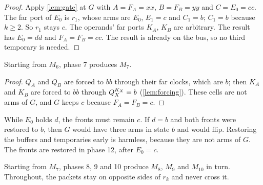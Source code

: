 \begin{proof}
Apply \cref{lem:gate} at $G$ with $A=F_A=xx$, $B=F_B=yy$ and $C=E_0=cc$. The far port of $E_0$ is
$r_1$, whose arms are $E_0$, $E_1=c$ and $C_1=b$; $C_1=b$ because $k\ge2$. So $r_1$ stays $c$. The
operands' far ports $K_A$, $K_B$ are arbitrary. The result has $E_0=dd$ and $F_A=F_B=cc$. The result
is already on the bus, so no third temporary is needed.
\end{proof}

\begin{lemma}\label{lem:clean}
Starting from $M_6$, phase 7 produces $M_7$.
\end{lemma}

\begin{proof}
$Q_A$ and $Q_B$ are forced to $bb$ through their far clocks, which are $b$; then $K_A$ and $K_B$ are
forced to $bb$ through $Q_X^{K_X}=b$ (\cref{lem:forcing}). These cells are not arms of $G$, and $G$
keeps $c$ because $F_A=F_B=c$.
\end{proof}

\begin{remark}\label{rem:fronts}
While $E_0$ holds $d$, the fronts must remain $c$. If $d=b$ and both fronts were restored to $b$, then
$G$ would have three arms in state $b$ and would flip. Restoring the buffers and temporaries early is
harmless, because they are not arms of $G$. The fronts are restored in phase 12, after $E_0=c$.
\end{remark}

\begin{lemma}\label{lem:writeroutes}
Starting from $M_7$, phases 8, 9 and 10 produce $M_8$, $M_9$ and $M_{10}$ in turn. Throughout, the
packets stay on opposite sides of $r_k$ and never cross it.
\end{lemma}


